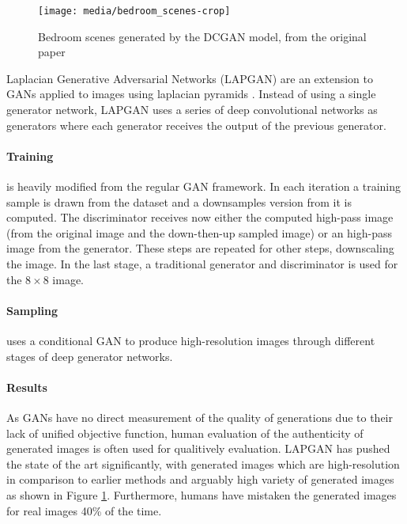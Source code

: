 \begin{figure}[t]
\centering
  \texttt{[image: media/bedroom\_scenes-crop]}
  \caption[Generated Samples by DCGAN]{Bedroom scenes generated by the DCGAN model, from the original paper\cite{lapgan:2015}}
  \label{fig:lapgan}
  \medskip
  \small
\end{figure}
Laplacian Generative Adversarial Networks (LAPGAN) \cite{lapgan:2015} are an extension to GANs applied to images using laplacian pyramids \cite{laplacian:1983}.
Instead of using a single generator network, LAPGAN uses a series of deep convolutional networks as generators where each generator receives the output of the previous generator.




\paragraph{Training} is heavily modified from the regular GAN framework.
In each iteration a training sample is drawn from the dataset and a downsamples version from it is computed.
The discriminator receives now either the computed high-pass image (from the original image and the down-then-up sampled image) or an high-pass image from the generator.
These steps are repeated for other steps, downscaling the image.
In the last stage, a traditional generator and discriminator is used for the $8\times8$ image.
\paragraph{Sampling} uses a conditional GAN to produce high-resolution images through different stages of deep generator networks.

\paragraph{Results}
As GANs have no direct measurement of the quality of generations due to their lack of unified objective function, human evaluation of the authenticity of generated images is often used for qualitively evaluation.
LAPGAN has pushed the state of the art significantly, with generated images which are high-resolution in comparison to earlier methods and arguably high variety of generated images as shown in Figure \ref{fig:lapgan}.
Furthermore, humans have mistaken the generated images for real images 40\% of the time.


